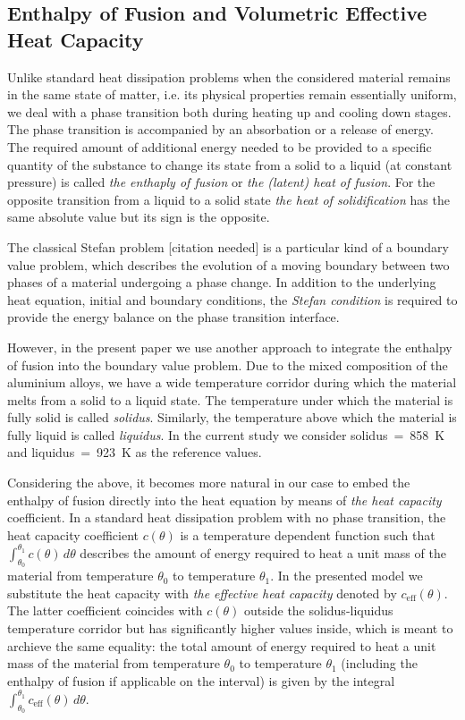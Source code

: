 \subsection{Enthalpy of Fusion and Volumetric Effective Heat Capacity}
\label{subsec:capacity}

Unlike standard heat dissipation problems when the considered material remains in the same state of matter, i.e. its physical properties remain essentially uniform, we deal with a phase transition both during heating up and cooling down stages. The phase transition is accompanied by an absorbation or a release of energy. The required amount of additional energy needed to be provided to a specific quantity of the substance to change its state from a solid to a liquid (at constant pressure) is called \emph{the enthaply of fusion} or \emph{the (latent) heat of fusion}. For the opposite transition from a liquid to a solid state \emph{the heat of solidification} has the same absolute value but its sign is the opposite.

The classical Stefan problem [citation needed] is a particular kind of a boundary value problem, which describes the evolution of a moving boundary between two phases of a material undergoing a phase change. In addition to the underlying heat equation, initial and boundary conditions, the \emph{Stefan condition} is required to provide the energy balance on the phase transition interface.

However, in the present paper we use another approach to integrate the enthalpy of fusion into the boundary value problem. Due to the mixed composition of the aluminium alloys, we have a wide temperature corridor during which the material melts from a solid to a liquid state. The temperature under which the material is fully solid is called \emph{solidus}. Similarly, the temperature above which the material is fully liquid is called \emph{liquidus}. In the current study we consider solidus~=~\SI{858}{\K} and liquidus~=~\SI{923}{K} as the reference values.

Considering the above, it becomes more natural in our case to embed the enthalpy of fusion directly into the heat equation by means of \emph{the heat capacity} coefficient. In a standard heat dissipation problem with no phase transition, the heat capacity coefficient $c(\theta)$ is a temperature dependent function such that $\int_{\theta_0}^{\theta_1} c(\theta)\, d\theta$ describes the amount of energy required to heat a unit mass of the material from temperature $\theta_0$ to temperature $\theta_1$. In the presented model we substitute the heat capacity with \emph{the effective heat capacity} denoted by $c_{\text{eff}}(\theta)$. The latter coefficient coincides with $c(\theta)$ outside the solidus-liquidus temperature corridor but has significantly higher values inside, which is meant to archieve the same equality: the total amount of energy required to heat a unit mass of the material from temperature $\theta_0$ to temperature $\theta_1$ (including the enthalpy of fusion if applicable on the interval) is given by the integral $\int_{\theta_0}^{\theta_1} c_{\text{eff}}(\theta)\, d\theta$.

